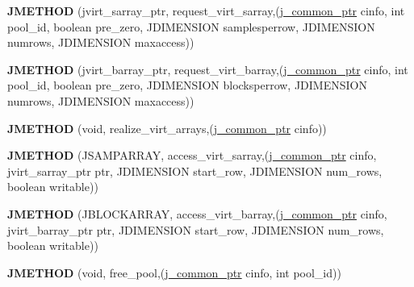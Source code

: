 \begin{DoxyCompactItemize}
\mbox{\label{structjpeg__memory__mgr_a34b830d9d7b2f4fd043e98421a700503}} 
{\bfseries J\+M\+E\+T\+H\+OD} (jvirt\+\_\+sarray\+\_\+ptr, request\+\_\+virt\+\_\+sarray,(\hyperlink{structjpeg__common__struct}{j\+\_\+common\+\_\+ptr} cinfo, int pool\+\_\+id, boolean pre\+\_\+zero, J\+D\+I\+M\+E\+N\+S\+I\+ON samplesperrow, J\+D\+I\+M\+E\+N\+S\+I\+ON numrows, J\+D\+I\+M\+E\+N\+S\+I\+ON maxaccess))
\item 
\mbox{\label{structjpeg__memory__mgr_aee93326ad6a64714443e90044614d2a6}} 
{\bfseries J\+M\+E\+T\+H\+OD} (jvirt\+\_\+barray\+\_\+ptr, request\+\_\+virt\+\_\+barray,(\hyperlink{structjpeg__common__struct}{j\+\_\+common\+\_\+ptr} cinfo, int pool\+\_\+id, boolean pre\+\_\+zero, J\+D\+I\+M\+E\+N\+S\+I\+ON blocksperrow, J\+D\+I\+M\+E\+N\+S\+I\+ON numrows, J\+D\+I\+M\+E\+N\+S\+I\+ON maxaccess))
\item 
\mbox{\label{structjpeg__memory__mgr_a35cc0c3b3ecbc7209cdc23b2255932d8}} 
{\bfseries J\+M\+E\+T\+H\+OD} (void, realize\+\_\+virt\+\_\+arrays,(\hyperlink{structjpeg__common__struct}{j\+\_\+common\+\_\+ptr} cinfo))
\item 
\mbox{\label{structjpeg__memory__mgr_a747ad4316a4794b13f9fdff4f6f699ca}} 
{\bfseries J\+M\+E\+T\+H\+OD} (J\+S\+A\+M\+P\+A\+R\+R\+AY, access\+\_\+virt\+\_\+sarray,(\hyperlink{structjpeg__common__struct}{j\+\_\+common\+\_\+ptr} cinfo, jvirt\+\_\+sarray\+\_\+ptr ptr, J\+D\+I\+M\+E\+N\+S\+I\+ON start\+\_\+row, J\+D\+I\+M\+E\+N\+S\+I\+ON num\+\_\+rows, boolean writable))
\item 
\mbox{\label{structjpeg__memory__mgr_aa460f4b500825e051306b8ce5583d052}} 
{\bfseries J\+M\+E\+T\+H\+OD} (J\+B\+L\+O\+C\+K\+A\+R\+R\+AY, access\+\_\+virt\+\_\+barray,(\hyperlink{structjpeg__common__struct}{j\+\_\+common\+\_\+ptr} cinfo, jvirt\+\_\+barray\+\_\+ptr ptr, J\+D\+I\+M\+E\+N\+S\+I\+ON start\+\_\+row, J\+D\+I\+M\+E\+N\+S\+I\+ON num\+\_\+rows, boolean writable))
\item 
\mbox{\label{structjpeg__memory__mgr_a7e7e063767441999982d22c5cc0e9423}} 
{\bfseries J\+M\+E\+T\+H\+OD} (void, free\+\_\+pool,(\hyperlink{structjpeg__common__struct}{j\+\_\+common\+\_\+ptr} cinfo, int pool\+\_\+id))

\end{DoxyCompactItemize}
